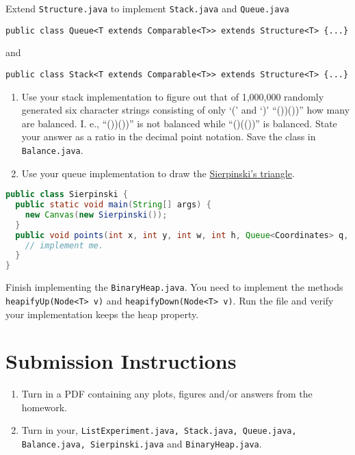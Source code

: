 \documentclass{homework}
\begin{document}
\question Extend \texttt{Structure.java} to implement \texttt{Stack.java}
and \texttt{Queue.java} \ie
\begin{verbatim}
public class Queue<T extends Comparable<T>> extends Structure<T> {...}
\end{verbatim}
and
\begin{verbatim}
public class Stack<T extends Comparable<T>> extends Structure<T> {...}
\end{verbatim}

\begin{enumerate}
  \item Use your stack implementation to figure out that of 1,000,000
        randomly generated six character strings consisting of only `('
        and `)' \eg ``())())'' how many are balanced. I. e., ``())())'' is
        not balanced while ``()(())'' is balanced. State your answer as a
        ratio in the decimal point notation. Save the class in
        \texttt{Balance.java}.
  \item Use your queue implementation to draw the
        \href{https://en.wikipedia.org/wiki/Sierpi%C5%84ski_triangle}{Sierpinski's triangle}.
\end{enumerate}


\begin{lstlisting}[language=Java]
public class Sierpinski {
  public static void main(String[] args) {
    new Canvas(new Sierpinski());
  }
  public void points(int x, int y, int w, int h, Queue<Coordinates> q, int r) {
    // implement me.
  }
}
\end{lstlisting}

\question \sloppy Finish implementing the \texttt{BinaryHeap.java}. You need to implement the methods \\
\texttt{heapifyUp(Node<T> v)} and
\texttt{heapifyDown(Node<T> v)}. Run the file and verify your implementation keeps the heap property.


\section*{Submission Instructions}

\begin{enumerate}
  \item Turn in a PDF containing any plots, figures and/or answers from
        the homework.
  \item Turn in your, \texttt{ListExperiment.java, Stack.java, Queue.java, Balance.java, Sierpinski.java} and \texttt{BinaryHeap.java}.
\end{enumerate}
\end{document}
